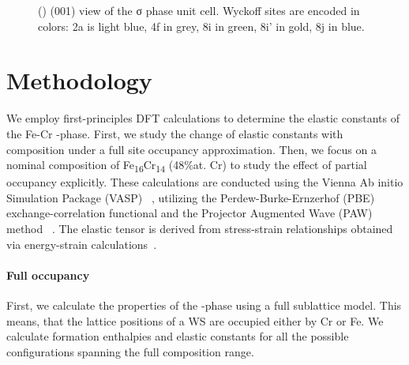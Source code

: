 \documentclass[superscriptaddress, 12pt]{revtex4-2}%
\begin{document}
\begin{figure}
  \caption{\protect\label{fig:introduction}
    () (001) view of the σ phase unit cell.
    Wyckoff sites are encoded in colors: 2a is light blue,
    4f in grey, 8i in green, 8i' in gold, 8j in blue.
  }
\end{figure}

\section{Methodology}

We employ first-principles DFT calculations to determine the elastic constants of the Fe-Cr \textsigma-phase. 
First, we study the change of elastic constants with composition under a full site occupancy approximation.
Then, we focus on a nominal composition of Fe\textsubscript{16}Cr\textsubscript{14} (48\%at. Cr) to study the effect of partial occupancy explicitly.
These calculations are conducted using the Vienna Ab initio Simulation Package (VASP) ~\cite{Hafner_vasp}, utilizing the Perdew-Burke-Ernzerhof (PBE) ~\cite{Perdew1996} exchange-correlation functional and the Projector Augmented Wave (PAW) method ~\cite{Bloch1994, kresse_ultrasoft_1999}.
The elastic tensor is derived from stress-strain relationships obtained via energy-strain calculations~\cite{golesorkhtabar_elastic_2013}.

\paragraph{Full occupancy}

First, we calculate the properties of the \textsigma-phase using a full sublattice model.
This means, that the lattice positions of a WS are occupied either by Cr or Fe.
We calculate formation enthalpies and elastic constants for all the possible configurations spanning the full composition range.
\end{document}
